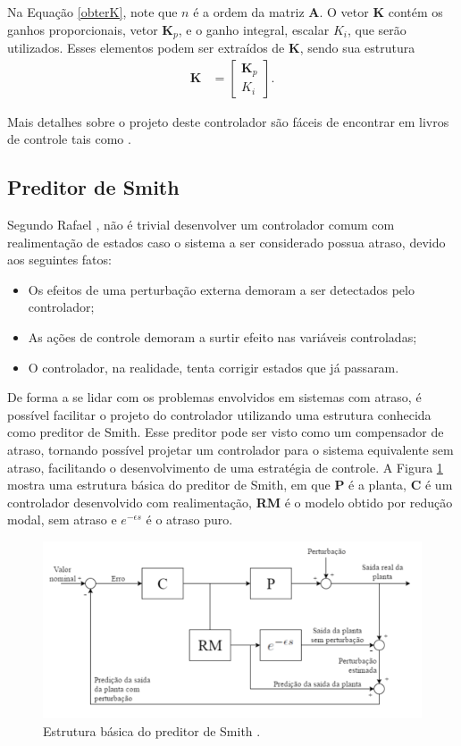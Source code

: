 Na Equação \ref{obterK}, note que $n$ é a ordem da matriz $\mathbf{A}$. O vetor $\mathbf{K}$ contém os ganhos proporcionais, vetor $\mathbf{K}_p$, e o ganho integral, escalar $K_i$, que serão utilizados. Esses elementos podem ser extraídos de $\mathbf{K}$, sendo sua estrutura \begin{align}
	\mathbf{K} & = \left[\begin{array}{c}\mathbf{K}_p\\ K_i\end{array}\right].
\end{align}

 Mais detalhes sobre o projeto deste controlador são fáceis de encontrar em livros de controle tais como \cite{OgataDiscrete:1995}.

\subsection{Preditor de Smith}

Segundo Rafael \cite{rafaelMestrado}, não é trivial desenvolver um controlador comum com
realimentação de estados caso o sistema a ser considerado possua atraso, devido aos seguintes fatos:
\begin{itemize}
\item Os efeitos de uma perturbação externa demoram a ser detectados pelo controlador;
\item As ações de controle demoram a surtir efeito nas variáveis controladas;
\item O controlador, na realidade, tenta corrigir estados que já passaram.
\end{itemize}

De forma a se lidar com os problemas envolvidos em sistemas com atraso, é possível facilitar o projeto do controlador utilizando uma estrutura conhecida como preditor de Smith. Esse preditor pode ser visto como um compensador de atraso, tornando possível projetar um controlador para o sistema equivalente sem atraso, facilitando o desenvolvimento de uma estratégia de controle. A Figura \ref{smith1} mostra uma estrutura básica do preditor de Smith, em que \textbf{P} é a planta, \textbf{C} é um controlador desenvolvido com realimentação, \textbf{RM} é o modelo obtido por redução modal, sem atraso e $e^{-\epsilon s}$ é o atraso puro.

\begin{figure}[!ht]
\centering
\includegraphics[width=.85\linewidth]{figs/fundamentos/preditorSmithSemKalman}
\caption{Estrutura básica do preditor de Smith \cite{rafaelMestrado}. \label{smith1}}
\end{figure}

